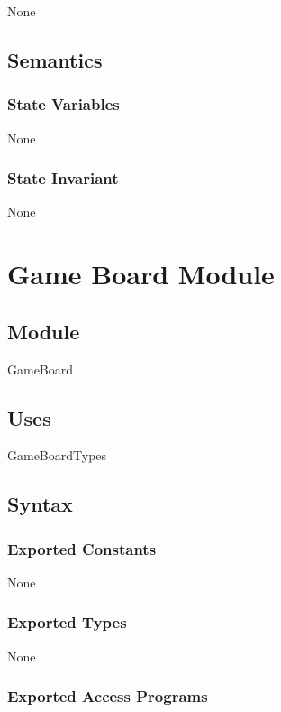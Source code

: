 \documentclass[12pt]{article}
\begin{document}
None

\subsection* {Semantics}

\subsubsection* {State Variables}

None

\subsubsection* {State Invariant}

None

\newpage

\section* {Game Board Module}

\subsection*{Module}

GameBoard

\subsection* {Uses}

GameBoardTypes

\subsection* {Syntax}

\subsubsection* {Exported Constants}

None

\subsubsection* {Exported Types}

None

\subsubsection* {Exported Access Programs}
\end{document}
